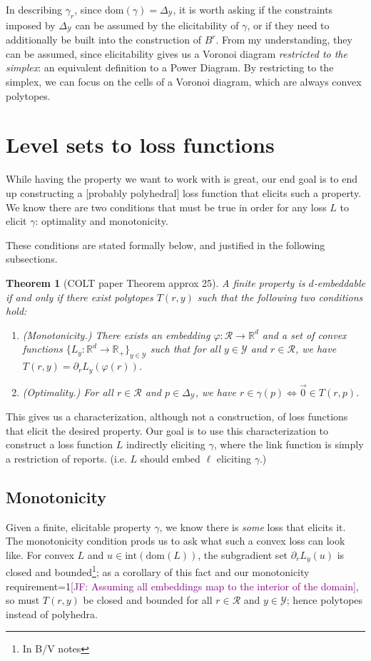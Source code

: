 \documentclass[12pt]{article}
\newcommand{\Comments}{1}
\newcommand{\mynote}[2]{\ifnum\Comments=1\textcolor{#1}{#2}\fi}
\newcommand{\jessie}[1]{\mynote{purple}{[JF: #1]}}
\newcommand{\reals}{\mathbb{R}}
\newcommand{\dom}{\mathrm{dom}}
\newcommand{\simplex}{\Delta_\Y}
\newcommand{\R}{\mathcal{R}}
\newcommand{\Y}{\mathcal{Y}}
\newcommand{\inter}[1]{\mathrm{int}(#1)}%
\newtheorem{theorem}{Theorem}
\begin{document}
In describing $\gamma_r$, since $\dom(\gamma) = \simplex$, it is worth asking if the constraints imposed by $\simplex$ can be assumed by the elicitability of $\gamma$, or if they need to additionally be built into the construction of $B^r$.
From my understanding, they can be assumed, since elicitability gives us a Voronoi diagram \emph{restricted to the simplex}: an equivalent definition to a Power Diagram.
By restricting to the simplex, we can focus on the cells of a Voronoi diagram, which are always convex polytopes.


\section*{Level sets to loss functions}
While having the property we want to work with is great, our end goal is to end up constructing a [probably polyhedral] loss function that elicits such a property.
We know there are two conditions that must be true in order for any loss $L$ to elicit $\gamma$: optimality and monotonicity.

These conditions are stated formally below, and justified in the following subsections.
\begin{theorem}[COLT paper Theorem approx 25]
A finite property is $d$-embeddable if and only if there exist polytopes $T(r,y)$ such that the following two conditions hold:
\begin{enumerate}
	\item (Monotonicity.) There exists an embedding $\varphi:\R \to \reals^d$ and a set of convex functions $\{L_y: \reals^d \to \reals_+\}_{y \in \Y}$ such that for all $y \in \Y$ and $r \in \R$, we have $T(r,y) = \partial_r L_y(\varphi(r))$.
	\item (Optimality.) For all $r \in \R$ and $p \in \simplex$, we have $r \in \gamma(p) \iff \vec 0 \in T(r,p)$.
\end{enumerate}
\end{theorem}

This gives us a characterization, although not a construction, of loss functions that elicit the desired property.
Our goal is to use this characterization to construct a loss function $L$ indirectly eliciting $\gamma$, where the link function is simply a restriction of reports.  (i.e. $L$ should embed $\ell$ eliciting $\gamma$.)

\subsection*{Monotonicity}
Given a finite, elicitable property $\gamma$, we know there is \emph{some} loss that elicits it.
The monotonicity condition prods us to ask what such a convex loss can look like.
For convex $L$ and $u \in \inter{\dom(L)}$, the subgradient set $\partial_r L_y(u)$ is closed and bounded\footnote{In B/V notes}; as a corollary of this fact and our monotonicity requirement\jessie{Assuming all embeddings map to the interior of the domain}, so must $T(r,y)$ be closed and bounded for all $r \in \R$ and $y \in \Y$; hence polytopes instead of polyhedra. 
\end{document}
